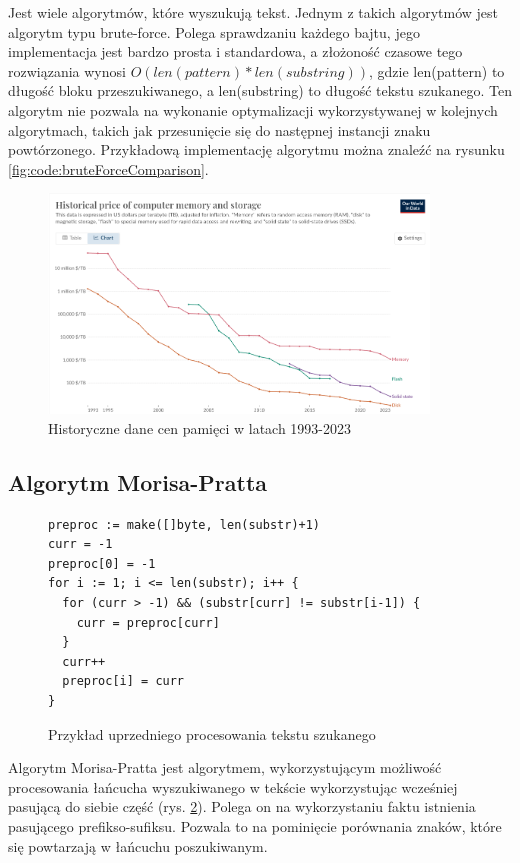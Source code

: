 Jest wiele algorytmów, które wyszukują tekst. Jednym z takich algorytmów jest 
algorytm typu brute-force. Polega sprawdzaniu każdego bajtu, jego implementacja
jest bardzo prosta i standardowa, a złożoność czasowe tego rozwiązania wynosi
$O(len(pattern) * len(substring))$, gdzie len(pattern) to długość bloku 
przeszukiwanego, a len(substring) to długość tekstu szukanego. Ten algorytm nie 
pozwala na wykonanie optymalizacji wykorzystywanej w kolejnych algorytmach, 
takich jak przesunięcie się do następnej instancji znaku powtórzonego. 
Przykładową implementację algorytmu można znaleźć na rysunku
\ref{fig:code:bruteForceComparison}.


\begin{figure}[h]
  \centering
  \includegraphics[width=0.9\textwidth]{./images/historical-mem-price.png}
  \caption{Historyczne dane cen pamięci w latach 1993-2023}
  \label{screenshot:MemPrices}
\end{figure}

\subsection{Algorytm Morisa-Pratta}

\begin{figure}[h]
  \centering
  \begin{lstlisting}
preproc := make([]byte, len(substr)+1)
curr = -1
preproc[0] = -1
for i := 1; i <= len(substr); i++ {
  for (curr > -1) && (substr[curr] != substr[i-1]) {
    curr = preproc[curr]
  }
  curr++
  preproc[i] = curr
}
  \end{lstlisting}
  \caption{Przykład uprzedniego procesowania tekstu szukanego}
  \label{fig:code:preprocessMorisPratt}
\end{figure}

Algorytm Morisa-Pratta jest algorytmem, wykorzystującym możliwość procesowania 
łańcucha wyszukiwanego w tekście wykorzystując wcześniej pasującą do siebie część
(rys. \ref{fig:code:preprocessMorisPratt}).
Polega on na wykorzystaniu faktu istnienia pasującego prefikso-sufiksu.
Pozwala to na pominięcie porównania znaków, które się powtarzają w łańcuchu poszukiwanym.

